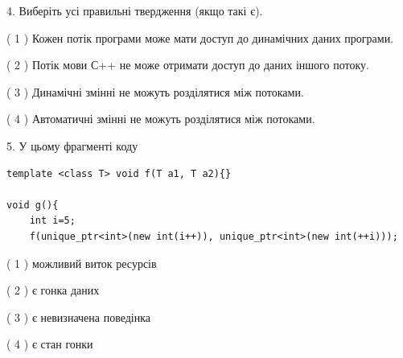 \documentclass[12pt, ukrainian]{article}
\begin{document}
\begin {large}
{%
4. Виберіть усі правильні твердження (якщо такі є).\par
\vspace{2mm}

( 1 ) Кожен потік програми може мати доступ до динамічних даних програми.%

( 2 ) Потік мови С++ не може отримати доступ до даних іншого потоку.%

( 3 ) Динамічні змінні не можуть розділятися між потоками.%

( 4 ) Автоматичні змінні не можуть розділятися між потоками.%


5. У цьому фрагменті коду
\begin{verbatim}
template <class T> void f(T a1, T a2){}

void g(){
    int i=5;
    f(unique_ptr<int>(new int(i++)), unique_ptr<int>(new int(++i)));
\end{verbatim}

( 1 ) можливий виток ресурсів%

( 2 ) є гонка даних%

( 3 ) є невизначена поведінка%

( 4 ) є стан гонки%
}
\end {large}
\end{document}
